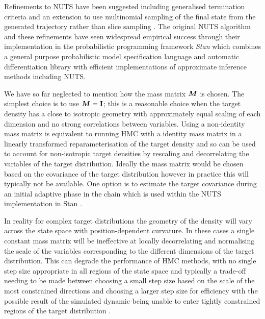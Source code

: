 Refinements to \ac{NUTS} have been suggested including generalised termination criteria \citep{betancourt2016identifying,betancourt2013generalizing} and an extension to use multinomial sampling of the final state from the generated trajectory rather than slice sampling \citep{betancourt2016identifying,betancourt2017conceptual}. The original \ac{NUTS} algorithm and these refinements have seen widespread empirical success through their implementation in the probabilistic programming framework \emph{Stan} \citep{carpenter2016stan} which combines a general purpose probabilistic model specification language \citep{stan2017stan} and automatic differentiation library \citep{carpenter2015stan} with efficient implementations of approximate inference methods including \ac{NUTS}.

We have so far neglected to mention how the mass matrix $\boldsymbol{M}$ is chosen. The simplest choice is to use $\boldsymbol{M} = \mathbf{I}$; this is a reasonable choice when the target density has a close to isotropic geometry with approximately equal scaling of each dimension and no strong correlations between variables. Using a non-identity mass matrix is equivalent to running \ac{HMC} with a identity mass matrix in a linearly transformed reparameterisation of the target density \citep{neal2011mcmc} and so can be used to account for non-isotropic target densities by rescaling and decorrelating the variables of the target distribution. Ideally the mass matrix would be chosen based on the covariance of the target distribution \citep{neal2011mcmc,betancourt2017conceptual} however in practice this will typically not be available. One option is to estimate the target covariance during an initial adaptive phase in the chain which is used within the \ac{NUTS} implementation in Stan \cite{carpenter2016stan}.

In reality for complex target distributions the geometry of the density will vary across the state space with position-dependent curvature. In these cases a single constant mass matrix will be ineffective at locally decorrelating and normalising the scale of the variables corresponding to the different dimensions of the target distribution. This can degrade the performance of \ac{HMC} methods, with no single step size appropriate in all regions of the state space and typically a trade-off needing to be made between choosing a small step size based on the scale of the most constrained directions and choosing a larger step size for efficiency with the possible result of the simulated dynamic being unable to enter tightly constrained regions of the target distribution \citep{betancourt2013general}. 

